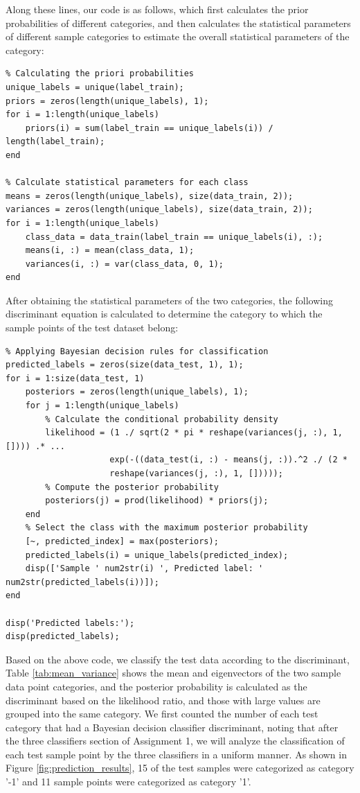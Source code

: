 \documentclass[12pt, onecolumn]{article}
\begin{document}
Along these lines, our code is as follows, which first calculates the prior probabilities of different categories, and then calculates the statistical parameters of different sample categories to estimate the overall statistical parameters of the category:
\begin{verbatim}
% Calculating the priori probabilities
unique_labels = unique(label_train);
priors = zeros(length(unique_labels), 1);
for i = 1:length(unique_labels)
    priors(i) = sum(label_train == unique_labels(i)) / length(label_train);
end

% Calculate statistical parameters for each class
means = zeros(length(unique_labels), size(data_train, 2));
variances = zeros(length(unique_labels), size(data_train, 2));
for i = 1:length(unique_labels)
    class_data = data_train(label_train == unique_labels(i), :);
    means(i, :) = mean(class_data, 1);
    variances(i, :) = var(class_data, 0, 1); 
end
\end{verbatim}

After obtaining the statistical parameters of the two categories, the following discriminant equation is calculated to determine the category to which the sample points of the test dataset belong:
\begin{verbatim}
% Applying Bayesian decision rules for classification
predicted_labels = zeros(size(data_test, 1), 1);
for i = 1:size(data_test, 1)
    posteriors = zeros(length(unique_labels), 1);
    for j = 1:length(unique_labels)
        % Calculate the conditional probability density 
        likelihood = (1 ./ sqrt(2 * pi * reshape(variances(j, :), 1, []))) .* ...
                     exp(-((data_test(i, :) - means(j, :)).^2 ./ (2 * 
                     reshape(variances(j, :), 1, []))));
        % Compute the posterior probability    
        posteriors(j) = prod(likelihood) * priors(j);
    end
    % Select the class with the maximum posterior probability
    [~, predicted_index] = max(posteriors);
    predicted_labels(i) = unique_labels(predicted_index);
    disp(['Sample ' num2str(i) ', Predicted label: ' num2str(predicted_labels(i))]);
end

disp('Predicted labels:');
disp(predicted_labels);
\end{verbatim}

Based on the above code, we classify the test data according to the discriminant, Table \ref{tab:mean_variance} shows the mean and eigenvectors of the two sample data point categories, and the posterior probability is calculated as the discriminant based on the likelihood ratio, and those with large values are grouped into the same category. We first counted the number of each test category that had a Bayesian decision classifier discriminant, noting that after the three classifiers section of Assignment 1, we will analyze the classification of each test sample point by the three classifiers in a uniform manner. As shown in Figure \ref{fig:prediction_results}, 15 of the test samples were categorized as category '-1' and 11 sample points were categorized as category '1'.
\end{document}
